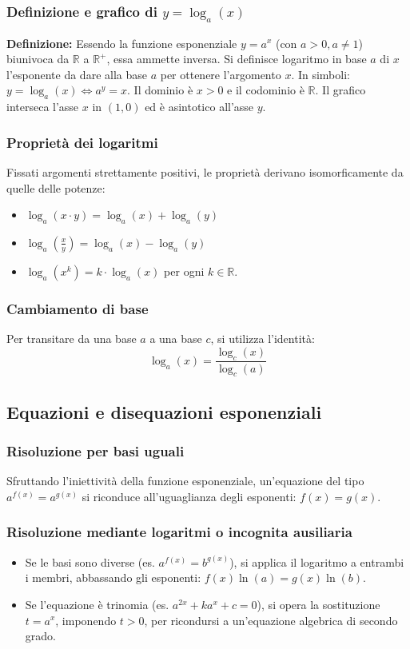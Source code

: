 \subsubsection{Definizione e grafico di $y = \log_a(x)$}
\textbf{Definizione:} Essendo la funzione esponenziale $y=a^x$ (con $a>0, a \neq 1$) biunivoca da $\mathbb{R}$ a $\mathbb{R}^+$, essa ammette inversa. Si definisce logaritmo in base $a$ di $x$ l'esponente da dare alla base $a$ per ottenere l'argomento $x$. In simboli: $y = \log_a(x) \iff a^y = x$.
Il dominio è $x > 0$ e il codominio è $\mathbb{R}$. Il grafico interseca l'asse $x$ in $(1,0)$ ed è asintotico all'asse $y$.

\subsubsection{Proprietà dei logaritmi}
Fissati argomenti strettamente positivi, le proprietà derivano isomorficamente da quelle delle potenze:
\begin{itemize}
    \item $\log_a(x \cdot y) = \log_a(x) + \log_a(y)$
    \item $\log_a\left(\frac{x}{y}\right) = \log_a(x) - \log_a(y)$
    \item $\log_a(x^k) = k \cdot \log_a(x)$ per ogni $k \in \mathbb{R}$.
\end{itemize}

\subsubsection{Cambiamento di base}
Per transitare da una base $a$ a una base $c$, si utilizza l'identità:
\[ \log_a(x) = \frac{\log_c(x)}{\log_c(a)} \]

\subsection{Equazioni e disequazioni esponenziali}
\subsubsection{Risoluzione per basi uguali}
Sfruttando l'iniettività della funzione esponenziale, un'equazione del tipo $a^{f(x)} = a^{g(x)}$ si riconduce all'uguaglianza degli esponenti: $f(x) = g(x)$.

\subsubsection{Risoluzione mediante logaritmi o incognita ausiliaria}
\begin{itemize}
    \item Se le basi sono diverse (es. $a^{f(x)} = b^{g(x)}$), si applica il logaritmo a entrambi i membri, abbassando gli esponenti: $f(x)\ln(a) = g(x)\ln(b)$.
    \item Se l'equazione è trinomia (es. $a^{2x} + k a^x + c = 0$), si opera la sostituzione $t = a^x$, imponendo $t > 0$, per ricondursi a un'equazione algebrica di secondo grado.
\end{itemize}

